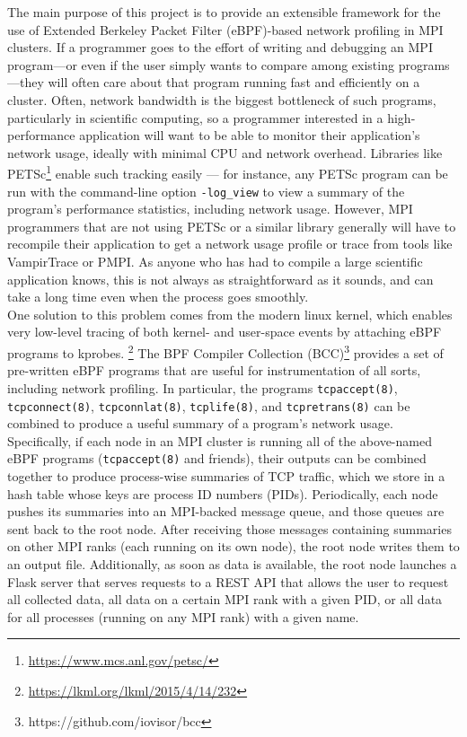 The main purpose of this project is to provide an extensible framework for the use of Extended Berkeley Packet Filter (eBPF)-based network profiling in MPI clusters. If a programmer goes to the effort of writing and debugging an MPI program---or even if the user simply wants to compare among existing programs---they will often care about that program running fast and efficiently on a cluster. Often, network bandwidth is the biggest bottleneck of such programs, particularly in scientific computing, so a programmer interested in a high-performance application will want to be able to monitor their application's network usage, ideally with minimal CPU and network overhead. Libraries like PETSc\footnote{\url{https://www.mcs.anl.gov/petsc/}} enable such tracking easily --- for instance, any PETSc program can be run with the command-line option \lstinline{-log_view} to view a summary of the program's performance statistics, including network usage. However, MPI programmers that are not using PETSc or a similar library generally will have to recompile their application to get a network usage profile or trace from tools like VampirTrace or PMPI. As anyone who has had to compile a large scientific application knows, this is not always as straightforward as it sounds, and can take a long time even when the process goes smoothly. \\
One solution to this problem comes from the modern linux kernel, which enables very low-level tracing of both kernel- and user-space events by attaching eBPF programs to kprobes. \footnote{\url{https://lkml.org/lkml/2015/4/14/232}} The BPF Compiler Collection (BCC)\footnote{https://github.com/iovisor/bcc} provides a set of pre-written eBPF programs that are useful for instrumentation of all sorts, including network profiling. In particular, the programs \lstinline{tcpaccept(8)}, \lstinline{tcpconnect(8)}, \lstinline{tcpconnlat(8)}, \lstinline{tcplife(8)}, and \lstinline{tcpretrans(8)} can be combined to produce a useful summary of a program's network usage. \\
Specifically, if each node in an MPI cluster is running all of the above-named eBPF programs (\lstinline{tcpaccept(8)} and friends), their outputs can be combined together to produce process-wise summaries of TCP traffic, which we store in a hash table whose keys are process ID numbers (PIDs). Periodically, each node pushes its summaries into an MPI-backed message queue, and those queues are sent back to the root node. After receiving those messages containing summaries on other MPI ranks (each running on its own node), the root node writes them to an output file. Additionally, as soon as data is available, the root node launches a Flask server that serves requests to a REST API that allows the user to request all collected data, all data on a certain MPI rank with a given PID, or all data for all processes (running on any MPI rank) with a given name.
